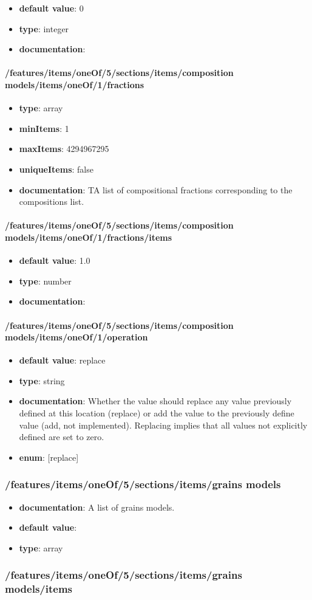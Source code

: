 \begin{itemize}\item {\bf default value}: 0
\item {\bf type}: integer
\item {\bf documentation}: 
\end{itemize}\paragraph{/features/items/oneOf/5/sections/items/composition models/items/oneOf/1/fractions}
\begin{itemize}\item {\bf type}: array
\item {\bf minItems}: 1
\item {\bf maxItems}: 4294967295
\item {\bf uniqueItems}: false
\item {\bf documentation}: TA list of compositional fractions corresponding to the compositions list.
\end{itemize}\paragraph{/features/items/oneOf/5/sections/items/composition models/items/oneOf/1/fractions/items}
\begin{itemize}\item {\bf default value}: 1.0
\item {\bf type}: number
\item {\bf documentation}: 
\end{itemize}\paragraph{/features/items/oneOf/5/sections/items/composition models/items/oneOf/1/operation}
\begin{itemize}\item {\bf default value}: replace
\item {\bf type}: string
\item {\bf documentation}: Whether the value should replace any value previously defined at this location (replace) or add the value to the previously define value (add, not implemented). Replacing implies that all values not explicitly defined are set to zero.
\item {\bf enum}: [replace]\end{itemize}\subsubsection{/features/items/oneOf/5/sections/items/grains models}
\begin{itemize}\item {\bf documentation}: A list of grains models.
\item {\bf default value}: 
\item {\bf type}: array
\end{itemize}\subsubsection{/features/items/oneOf/5/sections/items/grains models/items}

